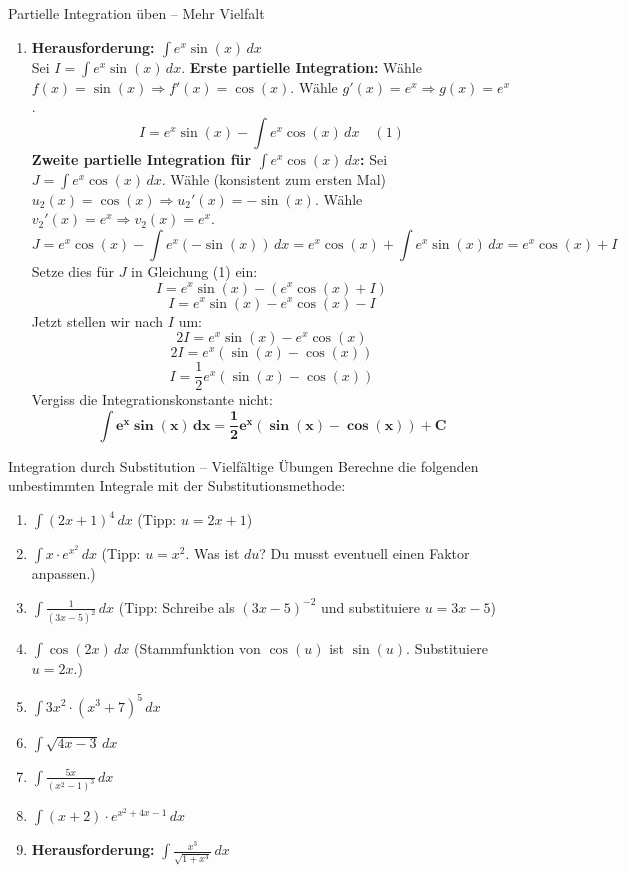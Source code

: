 \begin{loesungsumgebung}{Partielle Integration üben – Mehr Vielfalt}
\begin{enumerate}[label=(\alph*)]
    \item \textbf{Herausforderung: $\int e^x \sin(x) \,dx$} \\
    Sei $I = \int e^x \sin(x) \,dx$.
    \textbf{Erste partielle Integration:}
    Wähle $f(x) = \sin(x) \Rightarrow f'(x) = \cos(x)$.
    Wähle $g'(x) = e^x \Rightarrow g(x) = e^x$.
    $$ I = e^x \sin(x) - \int e^x \cos(x) \,dx \quad (1) $$
    \textbf{Zweite partielle Integration für $\int e^x \cos(x) \,dx$:}
    Sei $J = \int e^x \cos(x) \,dx$.
    Wähle (konsistent zum ersten Mal) $u_2(x) = \cos(x) \Rightarrow u_2'(x) = -\sin(x)$.
    Wähle $v_2'(x) = e^x \Rightarrow v_2(x) = e^x$.
    $$ J = e^x \cos(x) - \int e^x (-\sin(x)) \,dx = e^x \cos(x) + \int e^x \sin(x) \,dx = e^x \cos(x) + I $$
    Setze dies für $J$ in Gleichung (1) ein:
    $$ I = e^x \sin(x) - (e^x \cos(x) + I) $$
    $$ I = e^x \sin(x) - e^x \cos(x) - I $$
    Jetzt stellen wir nach $I$ um:
    $$ 2I = e^x \sin(x) - e^x \cos(x) $$
    $$ 2I = e^x (\sin(x) - \cos(x)) $$
    $$ I = \frac{1}{2}e^x (\sin(x) - \cos(x)) $$
    Vergiss die Integrationskonstante nicht:
    $$ \mathbf{\int e^x \sin(x) \,dx = \frac{1}{2}e^x (\sin(x) - \cos(x)) + C} $$
\end{enumerate}

\end{loesungsumgebung}


\begin{aufgabenumgebung}{Integration durch Substitution – Vielfältige Übungen}
Berechne die folgenden unbestimmten Integrale mit der Substitutionsmethode:
\begin{enumerate}
    \item $\int (2x+1)^4 \,dx$ (Tipp: $u=2x+1$)
    \item $\int x \cdot e^{x^2} \,dx$ (Tipp: $u=x^2$. Was ist $du$? Du musst eventuell einen Faktor anpassen.)
    \item $\int \frac{1}{(3x-5)^2} \,dx$ (Tipp: Schreibe als $(3x-5)^{-2}$ und substituiere $u=3x-5$)
    \item $\int \cos(2x) \,dx$ (Stammfunktion von $\cos(u)$ ist $\sin(u)$. Substituiere $u=2x$.)
    \item $\int 3x^2 \cdot (x^3+7)^5 \,dx$ 

    \item $\int \sqrt{4x-3} \,dx$ 

    \item $\int \frac{5x}{(x^2-1)^3} \,dx$

    \item $\int (x+2) \cdot e^{x^2+4x-1} \,dx$

    \item \textbf{Herausforderung:} $\int \frac{x^3}{\sqrt{1+x^4}} \,dx$

\end{enumerate}
\end{aufgabenumgebung}

